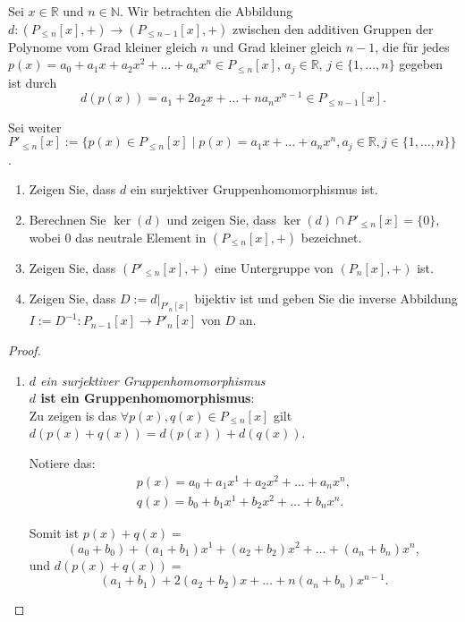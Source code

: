 \documentclass{../problemset}
\begin{document}
\begin{problem}
Sei $x \in \mathbb{R}$ und $n \in \mathbb{N}$.
Wir betrachten die Abbildung $d: (P_{\le n }[x], +) \to (P_{\le n-1}[x], +)$ zwischen den additiven Gruppen der Polynome vom Grad kleiner gleich $n$ und Grad kleiner gleich $n - 1$, die für jedes $p(x) = a_0 + a_1x + a_2x^2 + \ldots + a_nx^n \in P_{\le n}[x]$, $a_j \in \mathbb{R}$, $j \in \{1, \ldots, n\}$ gegeben ist durch \[
	d(p(x)) = a_1 + 2a_2x + \ldots + na_nx^{n-1} \in P_{\le n-1}[x].
\]

Sei weiter $P'_{\le n}[x] := \{p(x) \in P_{\le n}[x] \mid p(x) = a_1x + \ldots + a_nx^n, a_j \in \mathbb{R}, j \in \{1, \ldots, n\}\}$.

\begin{enumerate}
	\item Zeigen Sie, dass $d$ ein surjektiver Gruppenhomomorphismus ist.
	\item Berechnen Sie $\ker(d)$ und zeigen Sie, dass $\ker(d) \cap P'_{\le n}[x] = \{0\}$, wobei $0$ das neutrale Element in $(P_{\le n}[x], +)$ bezeichnet.
	\item Zeigen Sie, dass $(P'_{\le n}[x], +)$ eine Untergruppe von $(P_n[x], +)$ ist.
	\item Zeigen Sie, dass $D := d|_{P'_n[x]}$ bijektiv ist und geben Sie die inverse Abbildung $I := D^{-1}: P_{n-1}[x] \to P'_n[x]$ von $D$ an.
\end{enumerate}

\pagebreak

\begin{proof}
	\begin{enumerate}
		\item \textit{$d$ ein surjektiver Gruppenhomomorphismus} \\
		      \textbf{$d$ ist ein Gruppenhomomorphismus}: \\
		      Zu zeigen is das $\forall p(x),q(x) \in P_{\le n}[x]$ gilt $d(p(x) + q(x)) = d(p(x)) + d(q(x))$.

		      Notiere das:
		      \begin{align}
			      p(x) = a_0 + a_1x^1 + a_2x^2 + \ldots + a_nx^n, \\
			      q(x) = b_0 + b_1x^1 + b_2x^2 + \ldots + b_nx^n.
		      \end{align}

		      Somit ist $p(x) + q(x) =$ \[
			      (a_0+b_0) + (a_1+b_1)x^1 + (a_2 + b_2)x^2 + \ldots + (a_n+b_n)x^n,
		      \] und $d(p(x) + q(x)) =$ \[
			      (a_1+b_1) + 2(a_2 + b_2)x + \ldots + n(a_n+b_n)x^{n-1}.
		      \]


\end{enumerate}
\end{proof}
\end{problem}
\end{document}

